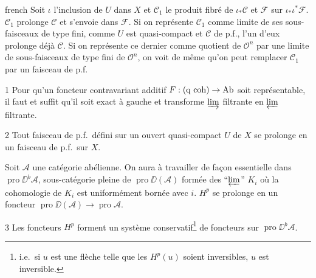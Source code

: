 \begin{hyphenrules}{french}
Soit $\iota$ l'inclusion de $U$ dans $X$ et $\mathcal{C}_1$ le produit fibr\'e de $\iota_*\mathcal{C}$ et $\mathcal{F}$ sur $\iota_*\iota^*\mathcal{F}$. $\mathcal{C}_1$ prolonge $\mathcal{C}$ et s'envoie dans $\mathcal{F}$. Si on repr\'esente $\mathcal{C}_1$ comme limite de ses sous-faisceaux de type fini, comme $U$ est quasi-compact et $\mathcal{C}$ de p.f., l'un d'eux prolonge d\'ej\`a $\mathcal{C}$. Si on repr\'esente ce dernier comme quotient de $\mathcal{O}^n$ par une limite de sous-faisceaux de type fini de $\mathcal{O}^n$, on voit de m\^eme qu'on peut remplacer $\mathcal{C}_1$ par un faisceau de p.f.

\begin{bookcorollary}{1}\label{app:cor1}
Pour qu'un foncteur contravariant additif $F: (\text{q coh}) \to \operatorname{Ab}$ soit repr\'esentable, il faut et suffit qu'il soit exact \`a gauche et transforme $\varinjlim$ filtrante en $\varprojlim$ filtrante.
\end{bookcorollary}

\begin{bookcorollary}{2}\label{app:cor2}
Tout faisceau de p.f.\ d\'efini sur un ouvert quasi-compact $U$ de $X$ se prolonge en un faisceau de p.f.\ sur $X$.
\end{bookcorollary}

Soit $\mathcal{A}$ une cat\'egorie ab\'elienne. On aura \`a travailler de fa\c{c}on essentielle dans $\operatorname{pro}\DD^b\mathcal{A}$, sous-cat\'egorie pleine de $\operatorname{pro}\DD(\mathcal{A})$ form\'ee des ``$\varprojlim$'' $K_i$ o\`u la cohomologie de $K_i$ est uniform\'ement born\'ee avec $i$. $H^p$ se prolonge en un foncteur $\operatorname{pro}\DD(\mathcal{A}) \longrightarrow \operatorname{pro}\mathcal{A}$.

\begin{bookproposition}{3}\label{app:prop3}
Les foncteurs $H^p$ forment un syst\`eme conservatif\footnote{i.e.\ si $u$ est une fl\`eche telle que les $H^p(u)$ soient inversibles, $u$ est inversible.} de foncteurs sur $\operatorname{pro}\DD^b\mathcal{A}$.
\end{bookproposition}


\end{hyphenrules}
